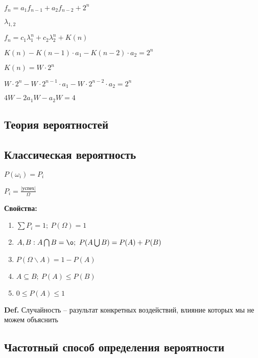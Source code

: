 \documentclass[14pt, letter paper]{article}
\begin{document}
$f_n = a_1f_{n-1} + a_2f_{n-2} + 2^n$

$\lambda_{1,2}$

$f_n = c_1\lambda_1^n + c_2\lambda_2^n + K(n)$

$K(n) - K(n-1) \cdot a_1 - K(n-2) \cdot a_2 = 2^n$

$K(n) = W \cdot 2^n$

$W \cdot 2^n - W \cdot 2^{n-1} \cdot a_1 - W \cdot 2^{n-2} \cdot a_2 = 2^n$

$4W - 2a_1W - a_2W = 4$

\vspace{5mm}

\begin{center}
    \section*{Теория вероятностей}
\end{center}

\begin{center}
    \subsection*{Классическая вероятность}
\end{center}

$P(\omega_i) = P_i$

$P_i = \frac{|\text{успех}|}{\Omega}$

\textbf{Свойства:}

\begin{enumerate}
    \item $\sum P_i = 1;\ P(\Omega) = 1$
    \item $A, B : A \bigcap B = \o;\ P(A \bigcup B) = P(A) + P(B)$
    \item $P(\Omega \backslash A) = 1 - P(A)$
    \item $A \subseteq B;\ P(A) \leq P(B)$
    \item $0 \leq P(A) \leq 1$
\end{enumerate}

\textbf{Def.} Случайность -- разультат конкретных воздействий, влияние которых мы не можем объяснить

\begin{center}
    \subsection*{Частотный способ определения вероятности}
\end{center}
\end{document}
